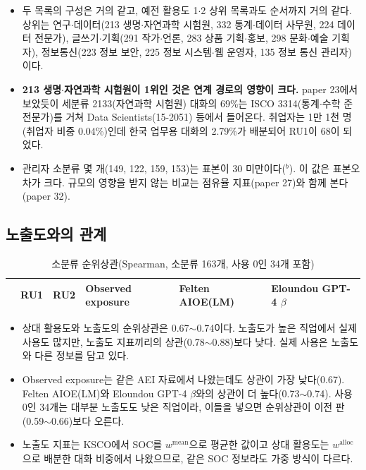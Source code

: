 \documentclass[11pt]{article}
\begin{document}
\begin{itemize}[leftmargin=*]
  \item 두 목록의 구성은 거의 같고, 예전 활용도 1$\cdot$2 상위 목록과도 순서까지 거의 같다. 상위는 연구$\cdot$데이터(213 생명$\cdot$자연과학 시험원, 332 통계$\cdot$데이터 사무원, 224 데이터 전문가), 글쓰기$\cdot$기획(291 작가$\cdot$언론, 283 상품 기획$\cdot$홍보, 298 문화$\cdot$예술 기획자), 정보통신(223 정보 보안, 225 정보 시스템$\cdot$웹 운영자, 135 정보 통신 관리자)이다.
  \item \textbf{213 생명$\cdot$자연과학 시험원이 1위인 것은 연계 경로의 영향이 크다.} paper 23에서 보았듯이 세분류 2133(자연과학 시험원) 대화의 69\%는 ISCO 3314(통계$\cdot$수학 준전문가)를 거쳐 Data Scientists(15-2051) 등에서 들어온다. 취업자는 1만 1천 명(취업자 비중 0.04\%)인데 한국 업무용 대화의 2.79\%가 배분되어 RU1이 68이 되었다.
  \item 관리자 소분류 몇 개(149, 122, 159, 153)는 표본이 30 미만이다($^{b}$). 이 값은 표본오차가 크다. 규모의 영향을 받지 않는 비교는 점유율 지표(paper 27)와 함께 본다(paper 32).
\end{itemize}

\subsection{노출도와의 관계}

\begin{longtable}{L{3.8cm}R{1.8cm}R{1.8cm}R{2.2cm}R{2.2cm}R{2.2cm}}
\caption{소분류 순위상관(Spearman, 소분류 163개, 사용 0인 34개 포함)}\label{tab:corr}\\
\toprule
 & RU1 & RU2 & Observed exposure & Felten AIOE(LM) & Eloundou GPT-4 $\beta$ \\
\midrule

\bottomrule
\end{longtable}

\begin{itemize}[leftmargin=*]
  \item 상대 활용도와 노출도의 순위상관은 0.67$\sim$0.74이다. 노출도가 높은 직업에서 실제 사용도 많지만, 노출도 지표끼리의 상관(0.78$\sim$0.88)보다 낮다. 실제 사용은 노출도와 다른 정보를 담고 있다.
  \item Observed exposure는 같은 AEI 자료에서 나왔는데도 상관이 가장 낮다(0.67). Felten AIOE(LM)와 Eloundou GPT-4 $\beta$와의 상관이 더 높다(0.73$\sim$0.74). 사용 0인 34개는 대부분 노출도도 낮은 직업이라, 이들을 넣으면 순위상관이 이전 판(0.59$\sim$0.66)보다 오른다.
  \item 노출도 지표는 KSCO에서 SOC를 $w^{\text{mean}}$으로 평균한 값이고 상대 활용도는 $w^{\text{alloc}}$으로 배분한 대화 비중에서 나왔으므로, 같은 SOC 정보라도 가중 방식이 다르다.
\end{itemize}
\end{document}
